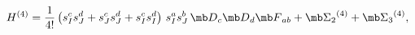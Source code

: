 \begin{equation}
H^{(4)}=\frac{1}{4!}\left(s^c_I s^d_J+s^c_J s^d_J+s^c_I s^d_I\right)\,s^a_I s^b_J\,
{\mb D}_c{\mb D}_d {\mb F}_{ab}+{\mb \Sigma_2}^{(4)}+{\mb \Sigma_3}^{(4)},
\label{H4FGK}
\end{equation}

